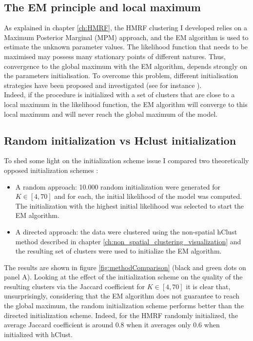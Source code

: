 	\subsection{The EM principle and local maximum}
As explained in chapter \ref{ch:HMRF}, the HMRF clustering I developed relies on a Maximum Posterior Marginal (MPM) approach, and the EM algorithm is used to estimate the unknown parameter values. The likelihood function that needs to be maximised may possess many stationary points of different natures. Thus, convergence to the global maximum with the EM algorithm, depends strongly on the parameters initialisation. To overcome this problem, different initialisation strategies have been proposed and investigated (see for instance \cite{biernacki03,karlis03,mclachlan04}).\\

Indeed, if the procedure is initialized with a set of clusters that are close to a local maximum in the likelihood function, the EM algorithm will converge to this local maximum and will never reach the global maximum of the model.

	\subsection{Random initialization vs Hclust initialization}
	To shed some light on the initialization scheme issue I compared two theoretically opposed initialization schemes :
\begin{itemize}
	\item A random approach: 10.000 random initialization were generated for $K \in [4,70]$ and for each, the initial likelihood of the model was computed. The initialization with the highest initial likelihood was selected to start the EM algorithm.
	\item A directed approach: the data were clustered using the non-spatial hClust method described in chapter \ref{ch:non_spatial_clustering_visualization} and the resulting set of clusters were used to initialize the EM algorithm.
\end{itemize}

The results are shown in figure \ref{fig:methodComparison} (black and green dots on panel A). Looking at the effect of the initialization scheme on the quality of the resulting clusters via the Jaccard coefficient for $K \in [4,70]$ it is clear that, unsurprisingly, considering that the EM algorithm does not guarantee to reach the global maximum, the random initialization scheme performs better than the directed initialization scheme. Indeed, for the HMRF randomly initialized, the average Jaccard coefficient is around $0.8$ when it averages only $0.6$ when initialized with hClust.\\

